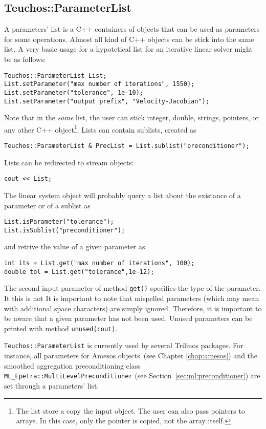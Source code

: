\clearpage

\subsection{Teuchos::ParameterList}
\label{sec:teuchos:ParameterList}

A parameters' list is a C++ containers of objects that can be used as
parameters for some operations. Almost all kind of C++ objects can be
stick into the same list. A very basic usage for a hypotetical list for
an iterative linear solver might be as follows:
\begin{verbatim}
Teuchos::ParameterList List;
List.setParameter("max number of iterations", 1550);
List.setParameter("tolerance", 1e-10);
List.setParameter("output prefix", "Velocity-Jacobian");
\end{verbatim}
Note that in the {\sl same} list, the user can stick integer, double,
strings, pointers, or any other C++ object\footnote{The list store a
  copy the input object. The user can also pass pointers to arrays. In
  this case, only the pointer is copied, not the array itself.}.  Lists
can contain sublists, created as
\begin{verbatim}
Teuchos::ParameterList & PrecList = List.sublist("preconditioner");
\end{verbatim}
Lists can be redirected to stream objects:
\begin{verbatim}
cout << List;
\end{verbatim}
The linear system object will probably query a list about the existance
of a parameter or of a sublist as
\begin{verbatim}
List.isParameter("tolerance");
List.isSublist("preconditioner");
\end{verbatim}
and retrive the value of a given parameter as
\begin{verbatim}
int its = List.get("max number of iterations", 100);
double tol = List.get("tolerance",1e-12);
\end{verbatim}
The second input parameter of method \verb!get()! specifies the type of
the parameter. It this is not 
It is important to note that mispelled parameters (which may mean with
additional space characters) are simply ignored. Therefore, it is
important to be aware that a given parameter has not been used. Unused
parameters can be printed with method \verb!unused(cout)!.

\begin{remark}
  \verb!Teuchos::ParameterList! is currently used by several Trilinos
  packages. For instance, all parameters for Amesos objects~(see Chapter
  \ref{chap:amesos}) and the smoothed aggregation preconditioning class
  \verb!ML_Epetra::MultiLevelPreconditioner! (see
  Section~\ref{sec:ml:preconditioner}) are set through a parameters'
  list.
\end{remark}


